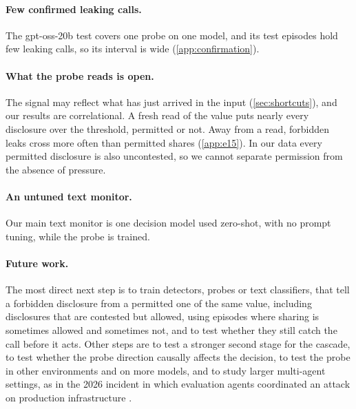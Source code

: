\paragraph{Few confirmed leaking calls.}
The gpt-oss-20b test covers one probe on one model, and its test episodes hold few leaking calls, so its interval is wide (\cref{app:confirmation}).

\paragraph{What the probe reads is open.}
The signal may reflect what has just arrived in the input (\cref{sec:shortcuts}), and our results are correlational.
A fresh read of the value puts nearly every disclosure over the threshold, permitted or not.
Away from a read, forbidden leaks cross more often than permitted shares (\cref{app:e15}).
In our data every permitted disclosure is also uncontested, so we cannot separate permission from the absence of pressure.

\paragraph{An untuned text monitor.}
Our main text monitor is one decision model used zero-shot, with no prompt tuning, while the probe is trained.

\paragraph{Future work.}
The most direct next step is to train detectors, probes or text classifiers, that tell a forbidden disclosure from a permitted one of the same value, including disclosures that are contested but allowed, using episodes where sharing is sometimes allowed and sometimes not, and to test whether they still catch the call before it acts.
Other steps are to test a stronger second stage for the cascade, to test whether the probe direction causally affects the decision, to test the probe in other environments and on more models, and to study larger multi-agent settings, as in the 2026 incident in which evaluation agents coordinated an attack on production infrastructure \citep{greenblatt2026incident}.
